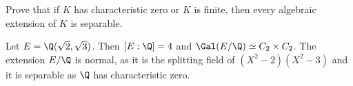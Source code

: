 \begin{exercise}
Prove that if $K$ has characteristic zero or $K$ is finite, then 
every algebraic extension of $K$ is separable. 
\end{exercise}


%



%
%
\begin{example}
    Let $E=\Q(\sqrt{2},\sqrt{3})$. Then 
    $[E:\Q]=4$ and 
    $\Gal(E/\Q)\simeq C_2\times C_2$. The extension $E/\Q$ is normal, 
    as it is the splitting field of $(X^2-2)(X^2-3)$ and 
    it is separable as $\Q$ has characteristic zero. 
\end{example}



